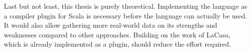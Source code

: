 Last but not least, this thesis is purely theoretical. Implementing the language as a compiler plugin for Scala is necessary before the language can actually be used. It would also allow gathering more real-world data on its strengths and weaknesses compared to other approaches. Building on the work of LaCasa, which is already implemented as a plugin, should reduce the effort required.
